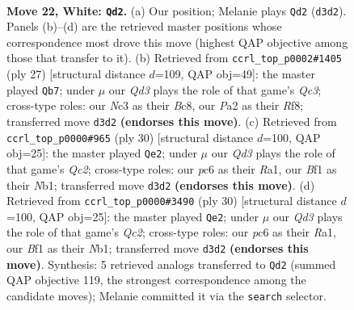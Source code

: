 \documentclass[11pt]{article}
\begin{document}
\clearpage

\begin{figure}[p]\centering
\begin{subfigure}{0.46\textwidth}\centering
\resizebox{\linewidth}{!}{%
\newchessgame
\chessboard[
  setfen={rnb1qrk1/1p5p/2p1p3/p2p1p2/1n1P1P2/2NQ1NP1/PPP2K1P/3R1B1R w - - 1 22},
  showmover=false,
  pgfstyle=straightmove, color=movearrow, markmove={d3-d2}
]}
\caption{}
\end{subfigure}\hfill
\begin{subfigure}{0.46\textwidth}\centering
\resizebox{\linewidth}{!}{%
\newchessgame
\chessboard[
  setfen={r1b2rk1/4ppbp/1pq2np1/p1p1N3/P1P5/2NP3P/1P3PP1/R1BQR1K1 b - - 0 14},
  showmover=false,
  pgfstyle=straightmove, color=movearrow, markmove={c6-b7}
]}
\caption{}
\end{subfigure}
\\[4pt]
\begin{subfigure}{0.46\textwidth}\centering
\resizebox{\linewidth}{!}{%
\newchessgame
\chessboard[
  setfen={rr4k1/2pqb1p1/p2ppn1p/1p6/Pn1PP3/4BN1P/1PQ2PP1/RN2R1K1 w - - 1 16},
  showmover=false,
  pgfstyle=straightmove, color=movearrow, markmove={c2-e2}
]}
\caption{}
\end{subfigure}\hfill
\begin{subfigure}{0.46\textwidth}\centering
\resizebox{\linewidth}{!}{%
\newchessgame
\chessboard[
  setfen={rr4k1/2pqb1p1/p2ppn1p/1p6/Pn1PP3/4BN1P/1PQ2PP1/RN2R1K1 w - - 1 16},
  showmover=false,
  pgfstyle=straightmove, color=movearrow, markmove={c2-e2}
]}
\caption{}
\end{subfigure}
\caption{\textbf{Move 22, White: \texttt{Qd2}.} (a) Our position; Melanie plays \texttt{Qd2} (\texttt{d3d2}). Panels (b)--(d) are the retrieved master positions whose correspondence most drove this move (highest QAP objective among those that transfer to it). (b) Retrieved from \texttt{ccrl\_top\_p0002\#1405} (ply 27) [structural distance $d$=109, QAP obj=49]: the master played \texttt{Qb7}; under $\mu$ our \emph{Qd3} plays the role of that game's \emph{Qc3}; cross-type roles: our \emph{N}c3 as their \emph{B}c8, our \emph{P}a2 as their \emph{R}f8; transferred move \texttt{d3d2} \textbf{(endorses this move)}. (c) Retrieved from \texttt{ccrl\_top\_p0000\#965} (ply 30) [structural distance $d$=100, QAP obj=25]: the master played \texttt{Qe2}; under $\mu$ our \emph{Qd3} plays the role of that game's \emph{Qc2}; cross-type roles: our \emph{p}c6 as their \emph{R}a1, our \emph{B}f1 as their \emph{N}b1; transferred move \texttt{d3d2} \textbf{(endorses this move)}. (d) Retrieved from \texttt{ccrl\_top\_p0000\#3490} (ply 30) [structural distance $d$=100, QAP obj=25]: the master played \texttt{Qe2}; under $\mu$ our \emph{Qd3} plays the role of that game's \emph{Qc2}; cross-type roles: our \emph{p}c6 as their \emph{R}a1, our \emph{B}f1 as their \emph{N}b1; transferred move \texttt{d3d2} \textbf{(endorses this move)}. Synthesis: 5 retrieved analogs transferred to \texttt{Qd2} (summed QAP objective 119, the strongest correspondence among the candidate moves); Melanie committed it via the \texttt{search} selector.}
\label{fig:thought-m42}
\end{figure}
\end{document}
